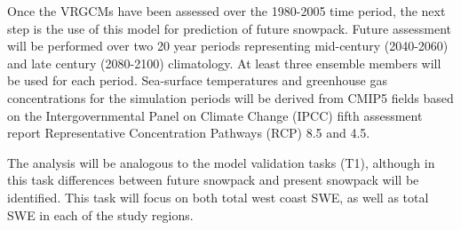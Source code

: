 \documentclass[11pt]{article}
\begin{document}
Once the VRGCMs have been assessed over the 1980-2005 time period, the next step is the use of this model for prediction of future snowpack.  Future assessment will be performed over two 20 year periods representing mid-century (2040-2060) and late century (2080-2100) climatology.  At least three ensemble members will be used for each period.  Sea-surface temperatures and greenhouse gas concentrations for the simulation periods will be derived from CMIP5 fields based on the Intergovernmental Panel on Climate Change (IPCC) fifth assessment report Representative Concentration Pathways (RCP) 8.5 and 4.5.

The analysis will be analogous to the model validation tasks (T1), although in this task differences between future snowpack and present snowpack will be identified.  This task will focus on both total west coast SWE, as well as total SWE in each of the study regions.



\end{document}
